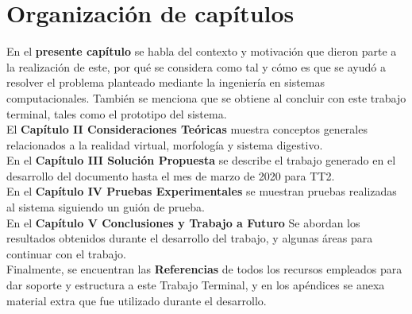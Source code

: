 \section{Organización de capítulos}
En el \textbf{presente capítulo} se habla del contexto y motivación que dieron parte a la realización  de este, por qué se considera como tal y 
cómo es que se ayudó a resolver el problema planteado mediante la ingeniería en sistemas computacionales. También se menciona que se obtiene al 
concluir con este trabajo terminal, tales como el prototipo del sistema.\\
El \textbf{Capítulo II Consideraciones Teóricas} muestra conceptos generales relacionados a la realidad virtual, morfología y sistema digestivo.\\
En el \textbf{Capítulo III Soluci\'on Propuesta} se describe el trabajo generado en el desarrollo del documento hasta el mes de marzo de 2020 para TT2.\\
En el \textbf{Capítulo IV Pruebas Experimentales} se muestran pruebas realizadas al sistema siguiendo un guión de prueba.\\ 
En el \textbf{Capítulo V Conclusiones y Trabajo a Futuro} Se abordan los resultados obtenidos durante el desarrollo del trabajo, 
y algunas áreas para continuar con el trabajo.\\
Finalmente, se encuentran las \textbf{Referencias} de todos los recursos empleados para dar soporte y estructura a este Trabajo Terminal, y en los 
apéndices se anexa material extra que fue utilizado durante el desarrollo.\\
